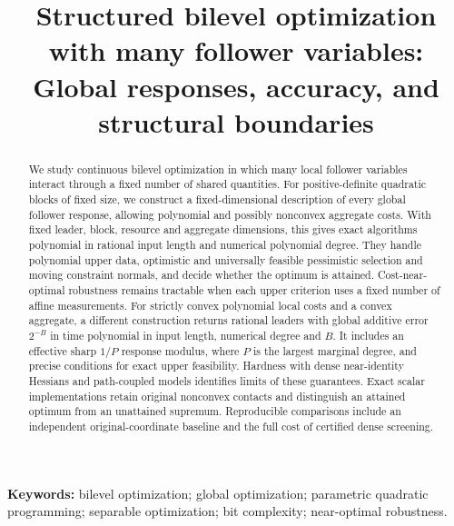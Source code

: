 \documentclass[11pt]{article}
\title{Structured bilevel optimization with many follower variables:\\
Global responses, accuracy, and structural boundaries}
\author{}
\date{}
\theoremstyle{definition}
\theoremstyle{remark}
\begin{document}
\maketitle
\begin{abstract}
We study continuous bilevel optimization in which many local follower variables
interact through a fixed number of shared quantities. For positive-definite
quadratic blocks of fixed size, we construct a fixed-dimensional description
of every global follower response, allowing polynomial and possibly nonconvex
aggregate costs. With fixed leader, block, resource and aggregate dimensions,
this gives exact algorithms polynomial in rational input length and numerical
polynomial degree. They handle polynomial upper data, optimistic and universally
feasible pessimistic selection and moving constraint normals, and decide
whether the optimum is attained. Cost-near-optimal robustness remains tractable when each upper
criterion uses a fixed number of affine measurements. For strictly convex
polynomial local costs and a convex aggregate, a different construction returns
rational leaders with global additive error $2^{-B}$ in time polynomial in
input length, numerical degree and $B$. It includes an effective sharp
$1/P$ response modulus, where $P$ is the largest marginal degree, and precise
conditions for exact upper feasibility. Hardness with dense near-identity
Hessians and path-coupled models identifies limits of these guarantees.
Exact scalar implementations retain original nonconvex contacts and distinguish
an attained optimum from an unattained supremum. Reproducible comparisons
include an independent original-coordinate baseline and the full cost of
certified dense screening.
\end{abstract}
\noindent\textbf{Keywords:} bilevel optimization; global optimization;
parametric quadratic programming; separable optimization; bit complexity;
near-optimal robustness.







\appendix






\end{document}
